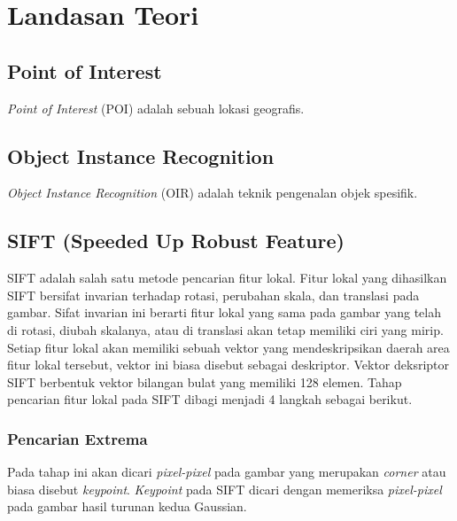 \chapter{Landasan Teori}
\label{chap:landasan_teori}

\section{Point of Interest}
\label{sec:poi}

\textit{Point of Interest} (POI) adalah sebuah lokasi geografis.

\section{Object Instance Recognition}
\label{sec:oir}

\textit{Object Instance Recognition} (OIR) adalah teknik pengenalan objek spesifik.

\section{SIFT (Speeded Up Robust Feature)}
\label{sec:sift}

SIFT adalah salah satu metode pencarian fitur lokal. Fitur lokal yang dihasilkan SIFT bersifat invarian terhadap rotasi, perubahan skala, dan translasi pada gambar. Sifat invarian ini berarti fitur lokal yang sama pada gambar yang telah di rotasi, diubah skalanya, atau di translasi akan tetap memiliki ciri yang mirip. Setiap fitur lokal akan memiliki sebuah vektor yang mendeskripsikan daerah area fitur lokal tersebut, vektor ini biasa disebut sebagai deskriptor. Vektor deksriptor SIFT berbentuk vektor bilangan bulat yang memiliki 128 elemen. Tahap pencarian fitur lokal pada SIFT dibagi menjadi 4 langkah sebagai berikut.

\subsection{Pencarian Extrema}
Pada tahap ini akan dicari \textit{pixel-pixel} pada gambar yang merupakan \textit{corner} atau biasa disebut \textit{keypoint}. \textit{Keypoint} pada SIFT dicari dengan memeriksa \textit{pixel-pixel} pada gambar hasil turunan kedua Gaussian. 

